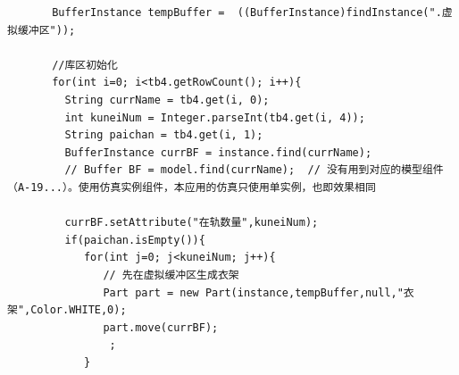 \begin{lstlisting}
       BufferInstance tempBuffer =  ((BufferInstance)findInstance(".虚拟缓冲区"));
       
       //库区初始化       
       for(int i=0; i<tb4.getRowCount(); i++){
         String currName = tb4.get(i, 0);
         int kuneiNum = Integer.parseInt(tb4.get(i, 4));
         String paichan = tb4.get(i, 1);
         BufferInstance currBF = instance.find(currName);
         // Buffer BF = model.find(currName);  // 没有用到对应的模型组件（A-19...）。使用仿真实例组件，本应用的仿真只使用单实例，也即效果相同
         
         currBF.setAttribute("在轨数量",kuneiNum);
         if(paichan.isEmpty()){
            for(int j=0; j<kuneiNum; j++){
               // 先在虚拟缓冲区生成衣架
               Part part = new Part(instance,tempBuffer,null,"衣架",Color.WHITE,0);
               part.move(currBF);
                ;
            }
            

\end{lstlisting}
